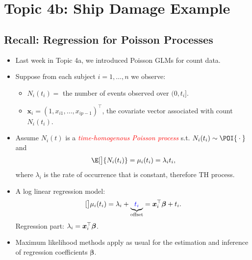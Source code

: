\documentclass{article}\usepackage[]{graphicx}\usepackage[svgnames]{xcolor}
\let\log\relax%
\providecommand{\Vector}[1]{\bm{#1}}%
\begin{document}
\section*{Topic 4b: Ship Damage Example}
\subsection*{Recall: Regression for Poisson Processes}
\begin{itemize}
    \item Last week in Topic 4a, we introduced Poisson GLMs for count data.
    \item Suppose from each subject $ i=1,\ldots,n $ we observe:
          \begin{itemize}
              \item $ N_i(t_i)= $ the number of events observed over $ (0,t_i] $.
              \item $ \Vector{x}_i=(1,x_{i1},\ldots,x_{ip-1})^\top $, the covariate vector associated with count $ N_i(t_i) $.
          \end{itemize}
    \item Assume $ N_i(t) $ is a \textcolor{Red}{\emph{time-homogenous Poisson process}} s.t. $ N_i(t_i)\sim \POI{\:\cdot\:} $ and
          \[ \E[\big]{N_i(t_i)}=\mu_i(t_i)=\lambda_i t_i, \]
          where $ \lambda_i $ is the rate of occurrence that is constant, therefore TH process.
    \item A log linear regression model:
          \[ \log[\big]{\mu_i(t_i)}=\log{\lambda_i}+\underbrace{\textcolor{Blue}{\log{t_i}}}_{\text{offset}}=\Vector{x}_i^\top \Vector{\beta}+\log{t_i}. \]
          Regression part: $ \log{\lambda_i}=\Vector{x}_i^\top \Vector{\beta} $.
    \item Maximum likelihood methods apply as usual for the estimation and inference of regression coefficients $ \Vector{\beta} $.
\end{itemize}
\end{document}
